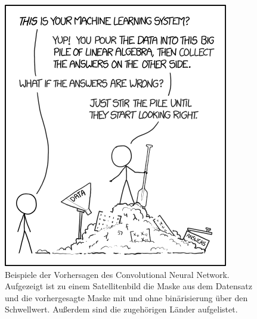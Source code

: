 \begin{figure}
    \centering
    \includegraphics[width=\textwidth]{images/placeholder.png}
    \caption{Beispiele der Vorhersagen des Convolutional Neural Network. %
    Aufgezeigt ist zu einem Satellitenbild die Maske aus dem Datensatz und %
    die vorhergesagte Maske mit und ohne binärisierung über den Schwellwert. %
    Außerdem sind die zugehörigen Länder aufgelistet.}
    \label{fig:beispiele_cnn}
\end{figure}

